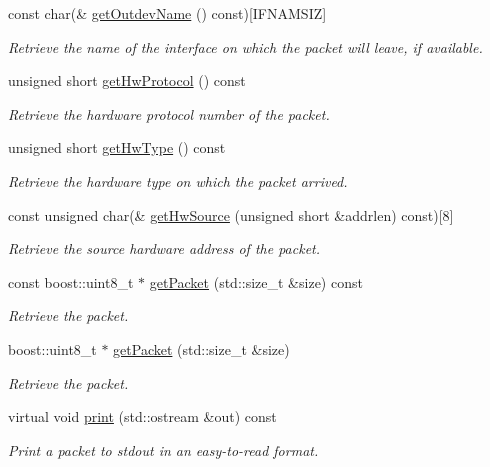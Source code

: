 \begin{DoxyCompactItemize}
const char(\& \hyperlink{classIPQ_1_1IpqPacket_a46dced8057de3bba7abfaaa63d7afcd4}{get\-Outdev\-Name} () const)\mbox{[}\-I\-F\-N\-A\-M\-S\-I\-Z\mbox{]}
\begin{DoxyCompactList}\small\item\em \-Retrieve the name of the interface on which the packet will leave, if available. \end{DoxyCompactList}\item 
unsigned short \hyperlink{classIPQ_1_1IpqPacket_ae150e294f043f4c699231a85d3b1ae0f}{get\-Hw\-Protocol} () const 
\begin{DoxyCompactList}\small\item\em \-Retrieve the hardware protocol number of the packet. \end{DoxyCompactList}\item 
unsigned short \hyperlink{classIPQ_1_1IpqPacket_ab6b76b146111c7ad11b96e87efe6634c}{get\-Hw\-Type} () const 
\begin{DoxyCompactList}\small\item\em \-Retrieve the hardware type on which the packet arrived. \end{DoxyCompactList}\item 
const unsigned char(\& \hyperlink{classIPQ_1_1IpqPacket_a8582ae732d6b66ca1f5201994159a84a}{get\-Hw\-Source} (unsigned short \&addrlen) const)\mbox{[}8\mbox{]}
\begin{DoxyCompactList}\small\item\em \-Retrieve the source hardware address of the packet. \end{DoxyCompactList}\item 
const boost\-::uint8\-\_\-t $\ast$ \hyperlink{classIPQ_1_1IpqPacket_a6dd7baeec66082658d882bff8862eb6c}{get\-Packet} (std\-::size\-\_\-t \&size) const 
\begin{DoxyCompactList}\small\item\em \-Retrieve the packet. \end{DoxyCompactList}\item 
boost\-::uint8\-\_\-t $\ast$ \hyperlink{classIPQ_1_1IpqPacket_a0bf3344a9eed5e2f6bc20890ffffe26e}{get\-Packet} (std\-::size\-\_\-t \&size)
\begin{DoxyCompactList}\small\item\em \-Retrieve the packet. \end{DoxyCompactList}\item 
virtual void \hyperlink{classIPQ_1_1IpqPacket_a5fed4f899ba91b52d1734a083e67b3cf}{print} (std\-::ostream \&out) const 
\begin{DoxyCompactList}\small\item\em \-Print a packet to stdout in an easy-\/to-\/read format. \end{DoxyCompactList}\end{DoxyCompactItemize}
